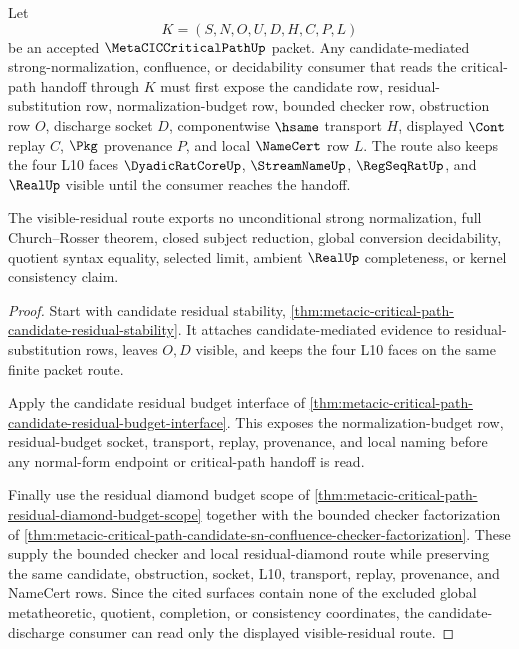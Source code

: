 \begin{theorem}
\label{thm:metacic-critical-path-candidate-discharge-visible-residual-route}
Let
$$
K=(S,N,O,U,D,H,C,P,L)
$$
be an accepted $\MetaCICCriticalPathUp$ packet. Any candidate-mediated strong-normalization, confluence, or decidability consumer that reads the critical-path handoff through $K$ must first expose the candidate row, residual-substitution row, normalization-budget row, bounded checker row, obstruction row $O$, discharge socket $D$, componentwise $\hsame$ transport $H$, displayed $\Cont$ replay $C$, $\Pkg$ provenance $P$, and local $\NameCert$ row $L$. The route also keeps the four L10 faces $\DyadicRatCoreUp$, $\StreamNameUp$, $\RegSeqRatUp$, and $\RealUp$ visible until the consumer reaches the handoff.

The visible-residual route exports no unconditional strong normalization, full Church--Rosser theorem, closed subject reduction, global conversion decidability, quotient syntax equality, selected limit, ambient $\RealUp$ completeness, or kernel consistency claim.
\end{theorem}
\begin{proof}
Start with candidate residual stability, \autoref{thm:metacic-critical-path-candidate-residual-stability}. It attaches candidate-mediated evidence to residual-substitution rows, leaves $O,D$ visible, and keeps the four L10 faces on the same finite packet route.

Apply the candidate residual budget interface of \autoref{thm:metacic-critical-path-candidate-residual-budget-interface}. This exposes the normalization-budget row, residual-budget socket, transport, replay, provenance, and local naming before any normal-form endpoint or critical-path handoff is read.

Finally use the residual diamond budget scope of \autoref{thm:metacic-critical-path-residual-diamond-budget-scope} together with the bounded checker factorization of \autoref{thm:metacic-critical-path-candidate-sn-confluence-checker-factorization}. These supply the bounded checker and local residual-diamond route while preserving the same candidate, obstruction, socket, L10, transport, replay, provenance, and NameCert rows. Since the cited surfaces contain none of the excluded global metatheoretic, quotient, completion, or consistency coordinates, the candidate-discharge consumer can read only the displayed visible-residual route.
\end{proof}


